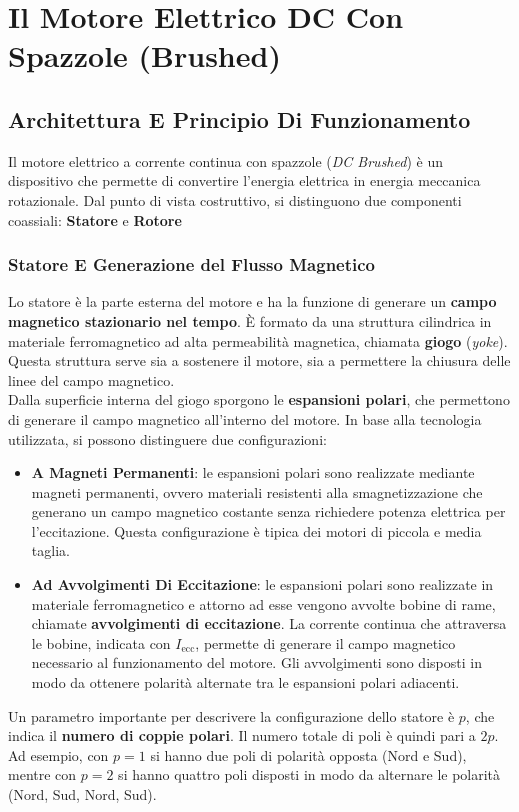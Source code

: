 ﻿\documentclass[11pt, a4paper]{article}
\begin{document}
\newpage

\section{Il Motore Elettrico DC Con Spazzole (Brushed)}

\subsection{Architettura E Principio Di Funzionamento}
Il motore elettrico a corrente continua con spazzole (\textit{DC Brushed}) è un dispositivo che permette di convertire l'energia elettrica in energia meccanica rotazionale. Dal punto di vista costruttivo, si distinguono due componenti coassiali: \textbf{Statore} e \textbf{Rotore}

\subsubsection{Statore E Generazione del Flusso Magnetico}
Lo statore è la parte esterna del motore e ha la funzione di generare un \textbf{campo magnetico stazionario nel tempo}. È formato da una struttura cilindrica in materiale ferromagnetico ad alta permeabilità magnetica, chiamata \textbf{giogo} (\textit{yoke}). Questa struttura serve sia a sostenere il motore, sia a permettere la chiusura delle linee del campo magnetico.\\
Dalla superficie interna del giogo sporgono le \textbf{espansioni polari}, che permettono di generare il campo magnetico all'interno del motore. In base alla tecnologia utilizzata, si possono distinguere due configurazioni:
\begin{itemize}
    \item \textbf{A Magneti Permanenti}: le espansioni polari sono realizzate mediante magneti permanenti, ovvero materiali resistenti alla smagnetizzazione che generano un campo magnetico costante senza richiedere potenza elettrica per l'eccitazione. Questa configurazione è tipica dei motori di piccola e media taglia.
    \item \textbf{Ad Avvolgimenti Di Eccitazione}: le espansioni polari sono realizzate in materiale ferromagnetico e attorno ad esse vengono avvolte bobine di rame, chiamate \textbf{avvolgimenti di eccitazione}. La corrente continua che attraversa le bobine, indicata con $I_{\text{ecc}}$, permette di generare il campo magnetico necessario al funzionamento del motore. Gli avvolgimenti sono disposti in modo da ottenere polarità alternate tra le espansioni polari adiacenti.
\end{itemize}
Un parametro importante per descrivere la configurazione dello statore è $p$, che indica il \textbf{numero di coppie polari}. Il numero totale di poli è quindi pari a $2p$. Ad esempio, con $p=1$ si hanno due poli di polarità opposta (Nord e Sud), mentre con $p=2$ si hanno quattro poli disposti in modo da alternare le polarità (Nord, Sud, Nord, Sud).
\end{document}

